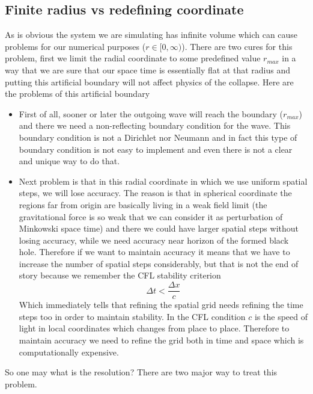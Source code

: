 \documentclass[a4paper,11pt]{article}
\begin{document}
\subsection{Finite radius vs redefining coordinate }
As is obvious the system we are simulating has infinite volume which can cause problems for our numerical purposes ($r\in [0,\infty)$). There are two cures for this problem, first we limit the radial coordinate to some predefined value $r_{max}$ in a way that we are sure that our space time is essentially flat at that radius and putting this artificial boundary will not affect physics of the collapse. Here are the problems of this artificial boundary
\begin{itemize}
	\item First of all, sooner or later the outgoing wave will reach the boundary ($r_{max}$) and there we need a non-reflecting boundary condition for the wave. This boundary condition is not a Dirichlet nor Neumann and in fact this type of boundary condition is not easy to implement and even there is not a clear and unique way to do that.
	\item Next problem is that in this radial coordinate in which we use uniform spatial steps, we will lose accuracy. The reason is that in spherical coordinate the regions far from origin are basically living in a weak field limit (the gravitational force is so weak that we can consider it as perturbation of Minkowski space time) and there we could have larger spatial steps without losing accuracy, while we need accuracy near horizon of the formed black hole. Therefore if we want to maintain accuracy it means that we have to increase the number of spatial steps considerably, but that is not the end of story because we remember the CFL stability criterion
	\begin{equation}
		\Delta t< \frac{\Delta x}{c}
	\end{equation}
	Which immediately tells that refining the spatial grid needs refining the time steps too in order to maintain stability. In the CFL condition $c$ is the speed of light in local coordinates which changes from place to place. Therefore to maintain accuracy we need to refine the grid both in time and space which is computationally expensive.
\end{itemize} 
So one may what is the resolution? There are two major way to  treat this problem.
\end{document}
